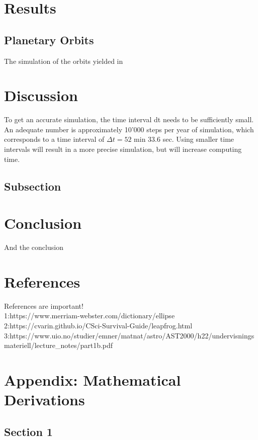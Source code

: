 \documentclass[reprint,english,notitlepage]{revtex4-2}
\begin{document}
\section{Results}
	\subsection{Planetary Orbits}
    The simulation of the orbits yielded in

\section{Discussion}
To get an accurate simulation, the time interval dt needs to be sufficiently small.
An adequate number is approximately 10'000 steps per year of simulation, which corresponds to a time interval of $\Delta t = 52$ min $33.6$ sec.
Using smaller time intervals will result in a more precise simulation, but will increase computing time.
	\subsection{Subsection}

\section{Conclusion}
And the conclusion


\section{References}
References are important!\\
1:\:https://www.merriam-webster.com/dictionary/ellipse\\
2:\:https://cvarin.github.io/CSci-Survival-Guide/leapfrog.html\\
3:\:https://www.uio.no/studier/emner/matnat/astro/AST2000/h22/undervisningsmateriell/lecture_notes/part1b.pdf

\section{Appendix: Mathematical Derivations}
	\subsection{Section 1}
	\begin{align*}

	\end{align*}
\end{document}
